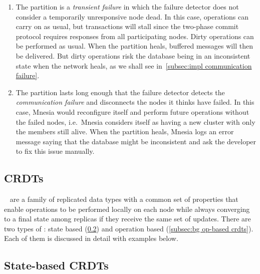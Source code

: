 \begin{enumerate}[label={NP\arabic*.},ref={NP\arabic*}]
  \item The partition is a \emph{transient failure} in which the failure 
  detector does not consider
  a temporarily unresponsive node dead. In this case, operations can carry on
  as usual, but transactions will stall since the two-phase commit protocol requires
  responses from all participating nodes. Dirty operations can be performed as usual.
  When the partition heals, buffered messages will then be delivered.
  But dirty operations risk the database being in an inconsistent 
  state when the network heals, as we shall see in~\cref{subsec:impl communication failure}.
  \label{itm:transient partition}
  \item The partition lasts long enough that the failure detector detects the
  \emph{communication failure} and disconnects the nodes it thinks have failed. 
  In this case, Mnesia would 
  reconfigure itself and perform future operations without the failed nodes, i.e.\ Mnesia considers
  itself as having a new cluster with only the members still alive. 
  When the partition heals, Mnesia
  logs an error message saying that the database might be inconsistent
  and ask the developer to fix this issue manually. \label{itm:comm failure}
\end{enumerate}


\subsection{CRDTs} \label{sec:bg crdt}

~\cite{preguica2018CRDT,shapiro2011CRDT} are a family of replicated 
data types with a common set of properties 
that enable operations to be performed locally on each node while always converging
to a final state among replicas if they receive the same set of updates. 
There are two types of : state 
based (\cref{subsec:bg state-based crdt}) and operation 
based (\cref{subsec:bg op-based crdts}). 
Each of them is discussed in detail with examples below.

\subsection{State-based CRDTs}  \label{subsec:bg state-based crdt}


